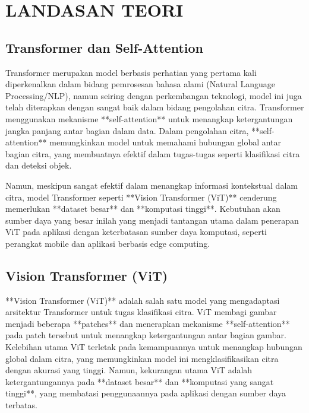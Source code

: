 \documentclass[11pt,a4paper]{article}
\begin{document}
\section{LANDASAN TEORI}

\subsection{Transformer dan Self-Attention}
Transformer merupakan model berbasis perhatian yang pertama kali diperkenalkan dalam bidang pemrosesan bahasa alami (Natural Language Processing/NLP), namun seiring dengan perkembangan teknologi, model ini juga telah diterapkan dengan sangat baik dalam bidang pengolahan citra. Transformer menggunakan mekanisme **self-attention** untuk menangkap ketergantungan jangka panjang antar bagian dalam data. Dalam pengolahan citra, **self-attention** memungkinkan model untuk memahami hubungan global antar bagian citra, yang membuatnya efektif dalam tugas-tugas seperti klasifikasi citra dan deteksi objek.

Namun, meskipun sangat efektif dalam menangkap informasi kontekstual dalam citra, model Transformer seperti **Vision Transformer (ViT)** cenderung memerlukan **dataset besar** dan **komputasi tinggi**. Kebutuhan akan sumber daya yang besar inilah yang menjadi tantangan utama dalam penerapan ViT pada aplikasi dengan keterbatasan sumber daya komputasi, seperti perangkat mobile dan aplikasi berbasis edge computing.

\subsection{Vision Transformer (ViT)}
**Vision Transformer (ViT)** adalah salah satu model yang mengadaptasi arsitektur Transformer untuk tugas klasifikasi citra. ViT membagi gambar menjadi beberapa **patches** dan menerapkan mekanisme **self-attention** pada patch tersebut untuk menangkap ketergantungan antar bagian gambar. Kelebihan utama ViT terletak pada kemampuannya untuk menangkap hubungan global dalam citra, yang memungkinkan model ini mengklasifikasikan citra dengan akurasi yang tinggi. Namun, kekurangan utama ViT adalah ketergantungannya pada **dataset besar** dan **komputasi yang sangat tinggi**, yang membatasi penggunaannya pada aplikasi dengan sumber daya terbatas.
\end{document}

